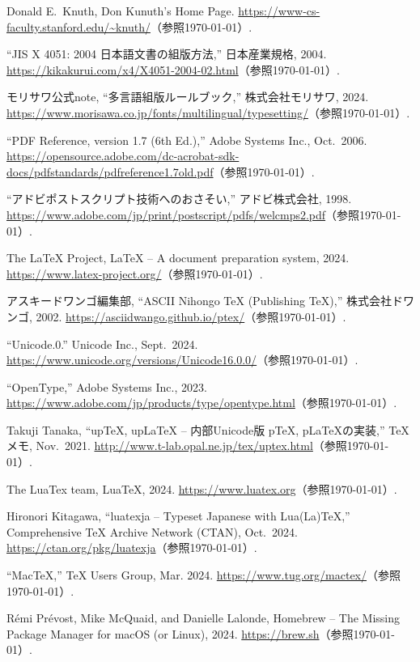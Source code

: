 \begin{thebibliography}{99}
Donald E.\ Knuth, Don Kunuth's Home Page. 
\url{https://www-cs-faculty.stanford.edu/~knuth/}（参照\today）.

``JIS X 4051: 2004 日本語文書の組版方法,'' 日本産業規格, 2004. 
\url{https://kikakurui.com/x4/X4051-2004-02.html}（参照\today）.

モリサワ公式note, ``多言語組版ルールブック,'' 株式会社モリサワ, 2024. 
\url{https://www.morisawa.co.jp/fonts/multilingual/typesetting/}（参照\today）.

``PDF Reference, version 1.7 (6th Ed.),'' Adobe Systems Inc., Oct.\ 2006. 
\url{https://opensource.adobe.com/dc-acrobat-sdk-docs/pdfstandards/pdfreference1.7old.pdf}（参照\today）.

``アドビポストスクリプト技術へのおさそい,'' アドビ株式会社, 1998. 
\url{https://www.adobe.com/jp/print/postscript/pdfs/welcmps2.pdf}（参照\today）.

The {\LaTeX} Project, {\LaTeX} -- A document preparation system, 2024.
\url{https://www.latex-project.org/}（参照\today）.

アスキードワンゴ編集部, ``ASCII Nihongo {\TeX} (Publishing {\TeX}),'' 株式会社ドワンゴ, 2002. 
\url{https://asciidwango.github.io/ptex/}（参照\today）.

 ``Unicode.0.'' Unicode Inc., Sept.\ 2024. 
\url{https://www.unicode.org/versions/Unicode16.0.0/}（参照\today）.

 ``OpenType\textregistered,'' Adobe Systems Inc., 2023. 
\url{https://www.adobe.com/jp/products/type/opentype.html}（参照\today）.

Takuji Tanaka, ``up{\TeX}, up{\LaTeX} -- 内部Unicode版 p{\TeX}, p{\LaTeX}の実装,'' TeXメモ, Nov.\ 2021. 
\url{http://www.t-lab.opal.ne.jp/tex/uptex.html}（参照\today）.

The LuaTex team, Lua{\TeX}, 2024. 
\url{https://www.luatex.org}（参照\today）.

Hironori Kitagawa, ``luatexja -- Typeset Japanese with Lua(La)\TeX,'' Comprehensive {\TeX} Archive Network (CTAN), Oct.\ 2024. 
\url{https://ctan.org/pkg/luatexja}（参照\today）.

 ``Mac{\TeX},'' {\TeX} Users Group, Mar. 2024. 
\url{https://www.tug.org/mactex/}（参照\today）.

 R\'{e}mi Pr\'{e}vost, Mike McQuaid, and Danielle Lalonde, Homebrew -- The Missing Package Manager for macOS (or Linux), 2024.
\url{https://brew.sh}（参照\today）.


\end{thebibliography}
